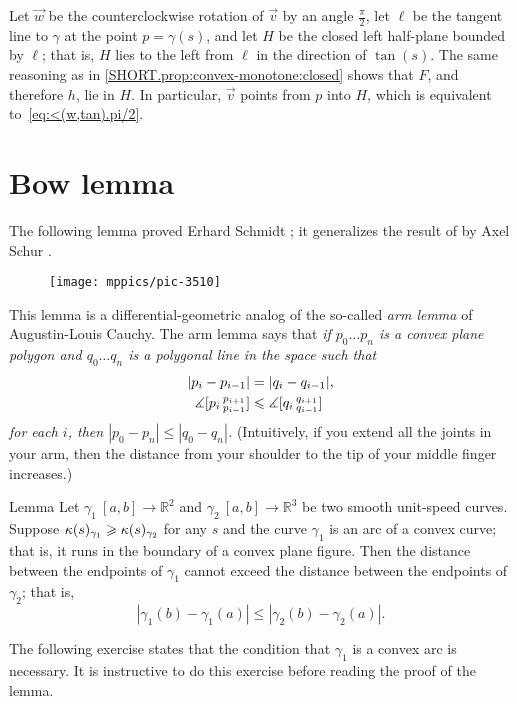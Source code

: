 Let $\vec w$ be the counterclockwise rotation of $\vec v$ by an angle $\tfrac\pi 2$, let
$\ell$ be the tangent line to $\gamma$ at the point $p=\gamma(s)$,
and let $H$ be the closed left half-plane bounded by $\ell$;
that is, $H$ lies to the left from $\ell$ in the direction of $\tan(s)$.
The same reasoning as in \ref{SHORT.prop:convex-monotone:closed} shows that $F$, and therefore $h$,
lie in $H$.
In particular, $\vec v$ points from $p$ into $H$, which is equivalent to~\ref{eq:<(w,tan).pi/2}.
\qeds

\section{Bow lemma}

The following lemma proved 
Erhard Schmidt \cite{schmidt}; it generalizes the result of by Axel Schur \cite{shur}.

\begin{wrapfigure}{r}{39 mm}
\vskip-6mm
\centering
\texttt{[image: mppics/pic-3510]}
\vskip-6mm
\end{wrapfigure}

This lemma is a differential-geometric analog of the so-called {}\emph{arm lemma} of Augustin-Louis Cauchy.
The arm lemma says that 
\textit{if $p_0\dots p_n$ is a convex plane polygon and $q_0\dots q_n$ is a polygonal line in the space such that 
\begin{align*}
|p_i-p_{i-1}|&=|q_i-q_{i-1}|,
\\
\measuredangle[p_i\,{}^{p_{i+1}}_{p_{i-1}}]&\leqslant \measuredangle[q_i\,{}^{q_{i+1}}_{q_{i-1}}]
\end{align*}
for each $i$, then $|p_0-p_n|\le |q_0-q_n|$.}
(Intuitively, if you extend all the joints in your arm, then the distance from your shoulder to the tip of your middle finger increases.) 

\begin{thm}{Lemma}\label{lem:bow}
Let $\gamma_1\:[a,b]\to\mathbb{R}^2$ and $\gamma_2\:[a,b] \to\mathbb{R}^3$ be two smooth unit-speed curves.
Suppose $\kappa(s)_{\gamma_1}\geqslant\kappa(s)_{\gamma_2}$ for any $s$ 
and the curve
$\gamma_1$ is an arc of a convex curve; that is, it runs in the boundary of a convex plane figure.
Then the distance between the endpoints of $\gamma_1$ cannot exceed the  distance between the endpoints of $\gamma_2$; that is,
\[|\gamma_1(b)-\gamma_1(a)|\le |\gamma_2(b)-\gamma_2(a)|.\]

\end{thm}

The following exercise states that the condition that $\gamma_1$ is a convex arc is necessary.
It is instructive to do this exercise before reading the proof of the lemma.

